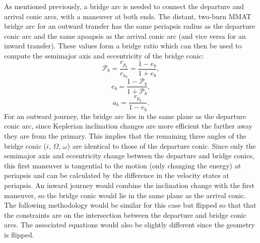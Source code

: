 As mentioned previously, a bridge arc is needed to connect the departure and arrival conic arcs,
with a maneuver at both ends. The distant, two-burn MMAT bridge arc for an outward transfer has the
same periapsis radius as the departure conic arc and the same apoapsis as the arrival conic arc
(and vice versa for an inward transfer). These values form a bridge ratio which can then be used to
compute the semimajor axis and eccentricity of the bridge conic:
\begin{equation}
    \mathcal{P}_{b}=\frac{r_{p_{b}}}{r_{a_{b}}}=\frac{1-e_{b}}{1+e_{b}},
    \label{eq:bridgeratio}
\end{equation}
\begin{equation}
    e_{b}=\frac{1-\mathcal{P}_{b}}{1+\mathcal{P}_{b}},
    \label{eq:bridgeeccentricity}
\end{equation}
\begin{equation}
    a_{b}=\frac{r_{p_{b}}}{1-e_{b}}.
    \label{eq:bridgesemimajoraxis}
\end{equation}
For an outward journey, the bridge arc lies in the same plane as the departure conic arc, since
Keplerian inclination changes are more efficient the farther away they are from the primary. This
implies that the remaining three angles of the bridge conic ($i$, $\Omega$, $\omega$) are identical
to those of the departure conic. Since only the semimajor axis and eccentricity change between the
departure and bridge conics, this first maneuver is tangential to the motion (only changing the
energy) at periapsis and can be calculated by the difference in the velocity states at periapsis.
An inward journey would combine the inclination change with the first maneuver, so the bridge conic
would lie in the same plane as the arrival conic. The following methodology would be similar for
this case but flipped so that that the constraints are on the intersection between the departure
and bridge conic arcs. The associated equations would also be slightly different since the geometry
is flipped.

